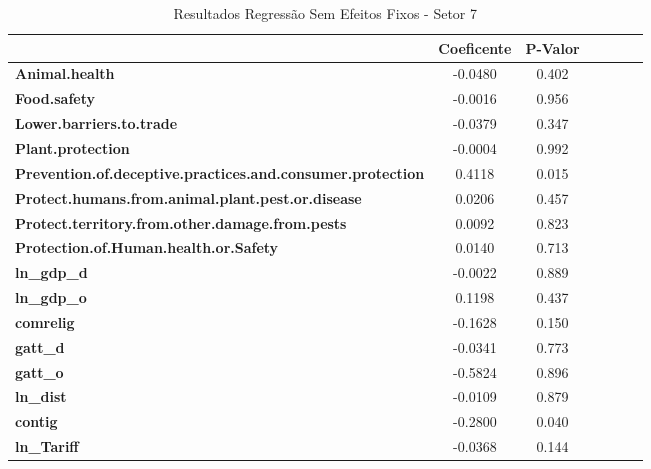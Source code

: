 \begin{table}[ht]
\begin{center}
\begin{tabular}{lcccccc}
& \textbf{Coeficente} & \textbf{P-Valor} \\
\midrule
\textbf{Animal.health}                                             &      -0.0480 &   0.402  \\
\textbf{Food.safety}                                               &      -0.0016 &   0.956  \\
\textbf{Lower.barriers.to.trade}                                   &      -0.0379 &   0.347  \\
\textbf{Plant.protection}                                          &      -0.0004 &   0.992  \\
\textbf{Prevention.of.deceptive.practices.and.consumer.protection} &       0.4118 &   0.015  \\
\textbf{Protect.humans.from.animal.plant.pest.or.disease}          &       0.0206 &   0.457  \\
\textbf{Protect.territory.from.other.damage.from.pests}            &       0.0092 &   0.823  \\
\textbf{Protection.of.Human.health.or.Safety}                      &       0.0140 &   0.713  \\
\textbf{ln\_gdp\_d}                                                &      -0.0022 &   0.889  \\
\textbf{ln\_gdp\_o}                                                &       0.1198 &   0.437  \\
\textbf{comrelig}                                                  &      -0.1628 &   0.150  \\
\textbf{gatt\_d}                                                   &      -0.0341 &   0.773  \\
\textbf{gatt\_o}                                                   &      -0.5824 &   0.896  \\
\textbf{ln\_dist}                                                  &      -0.0109 &   0.879  \\
\textbf{contig}                                                    &      -0.2800 &   0.040  \\
\textbf{ln\_Tariff}                                                &      -0.0368 &   0.144  \\
\bottomrule
\end{tabular}
\caption{Resultados Regressão Sem Efeitos Fixos - Setor 7}
\end{center}
\end{table}